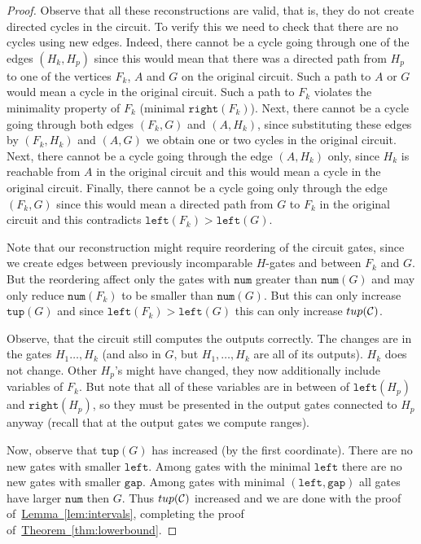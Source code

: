 \documentclass[11pt]{article}
\numberwithin{equation}{section}
\theoremstyle{definition}
\theoremstyle{plain}
\newcommand{\expref}[2]{\hyperref[#2]{#1~\ref{#2}}}
\theoremstyle{plain}\newtheorem{observation}[theorem]{Observation}
\newcommand{\lef}{\texttt{left}}
\newcommand{\righ}{\texttt{right}}
\newcommand{\gap}{\texttt{gap}}
\newcommand{\num}{\texttt{num}}
\newcommand{\tup}{\texttt{tup}}
\begin{document}
\begin{proof}[Proof]
    Observe that all these reconstructions are valid, that is, they do not create directed cycles in the circuit. To verify this we need to check that there are no cycles using new edges. Indeed, there cannot be a cycle going through one of the edges $(H_k,H_p)$ since this would mean that there was a directed path from $H_p$ to one of the vertices $F_k$, $A$ and $G$ on the original circuit. Such a path to $A$ or $G$ would mean a cycle in the original circuit. Such a path to $F_k$ violates the minimality property of $F_k$ (minimal $\righ(F_k)$). Next, there cannot be a cycle going through both edges $(F_k,G)$ and $(A,H_k)$, since substituting these edges by $(F_k,H_k)$ and $(A,G)$ we obtain one or two cycles in the original circuit. Next, there cannot be a cycle going through the edge $(A,H_k)$ only, since $H_k$ is reachable from $A$ in the original circuit and this would mean a cycle in the original circuit. Finally, there cannot be a cycle going only through the edge $(F_k,G)$ since this would mean a directed path from $G$ to $F_k$ in the original circuit and this contradicts $\lef(F_k)>\lef(G)$.

    Note that our reconstruction might require reordering of the circuit gates, since we create edges between previously incomparable $H$-gates and between $F_k$ and $G$. But the reordering affect only the gates with $\num$ greater than $\num(G)$ and may only reduce $\num(F_k)$ to be smaller than $\num(G)$. But this can only increase $\tup(G)$ and since $\lef(F_k)>\lef(G)$ this can only increase $\tup({\cal C})$.

    Observe, that the circuit still computes the outputs correctly. The changes are in the gates $H_1\ldots, H_k$ (and also in $G$, but $H_1,\ldots, H_k$ are all of its outputs). $H_k$ does not change. Other $H_p$'s might have changed, they now additionally include variables of $F_k$. But note that all of these variables are in between of $\lef(H_p)$ and $\righ(H_p)$, so they must be presented in the output gates connected to $H_p$ anyway (recall that at the output gates we compute ranges).

    Now, observe that $\tup(G)$ has increased (by the first coordinate). There are no new gates with smaller $\lef$. Among gates with the minimal $\lef$ there are no new gates with smaller $\gap$. Among gates with minimal $(\lef,\gap)$ all gates have larger $\num$ then $G$. Thus $\tup({\cal C})$ increased
    and we are done  %
%
	with the proof of~\expref{Lemma}{lem:intervals},
	completing the proof of~\expref{Theorem}{thm:lowerbound}.
\end{proof}
\end{document}

